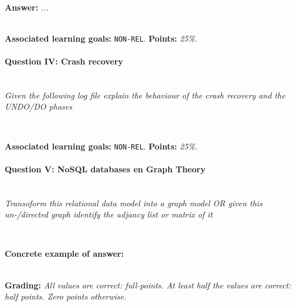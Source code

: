 \ \\ 

\textbf{Answer:} \textit{...}


\ \\ 
\textbf{Associated learning goals:} \texttt{NON-REL}.
\textbf{Points:} \textit{25\%.}
\paragraph{Question IV: Crash recovery}

\ \\ 

\textit{Given the following log file explain the behaviour of the crash recovery and the UNDO/DO phases}

\begin{lstlisting}
\end{lstlisting}

\ \\ 
\textbf{Associated learning goals:} \texttt{NON-REL}.
\textbf{Points:} \textit{25\%.}
\paragraph{Question V: NoSQL databases en Graph Theory}

\ \\ 

\textit{Transoform this relational data model into a graph model OR given this un-/directed graph identify the adjancy list or matrix of it}

\begin{lstlisting}
\end{lstlisting}

\ \\ 

\textbf{Concrete example of answer:} \textit{}

\ \\ 
\textbf{Grading:} \textit{All values are correct: full-points. At least half the values are correct: half points. Zero points otherwise.}

\ \\ 
